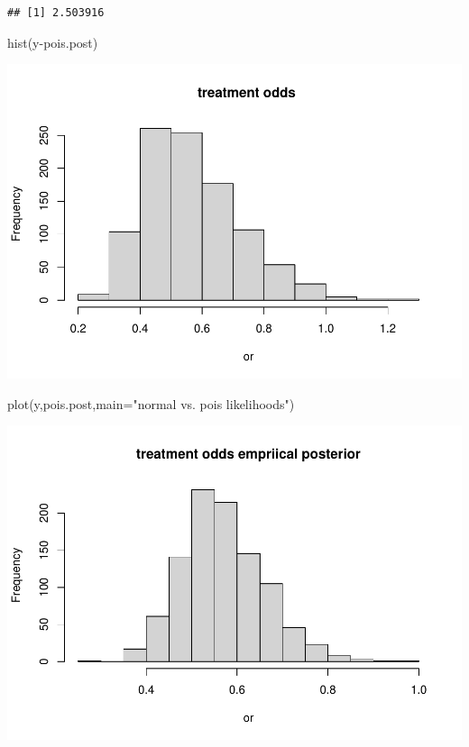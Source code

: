 \documentclass[
]{book}
\newenvironment{Shaded}{\begin{snugshade}}{\end{snugshade}}
\newcommand{\AttributeTok}[1]{\textcolor[rgb]{0.77,0.63,0.00}{#1}}
\newcommand{\FunctionTok}[1]{\textcolor[rgb]{0.00,0.00,0.00}{#1}}
\newcommand{\NormalTok}[1]{#1}
\newcommand{\SpecialCharTok}[1]{\textcolor[rgb]{0.00,0.00,0.00}{#1}}
\newcommand{\StringTok}[1]{\textcolor[rgb]{0.31,0.60,0.02}{#1}}
\theoremstyle{definition}
\theoremstyle{definition}
\theoremstyle{definition}
\theoremstyle{definition}
\theoremstyle{remark}
\begin{document}
\begin{verbatim}
## [1] 2.503916
\end{verbatim}

\begin{Shaded}
\begin{Highlighting}[]
 \FunctionTok{hist}\NormalTok{(y}\SpecialCharTok{{-}}\NormalTok{pois.post)}
\end{Highlighting}
\end{Shaded}

\includegraphics{_main_files/figure-latex/unnamed-chunk-38-1.pdf}

\begin{Shaded}
\begin{Highlighting}[]
 \FunctionTok{plot}\NormalTok{(y,pois.post,}\AttributeTok{main=}\StringTok{"normal vs. pois likelihoods"}\NormalTok{)}
\end{Highlighting}
\end{Shaded}

\includegraphics{_main_files/figure-latex/unnamed-chunk-38-2.pdf}
\end{document}
